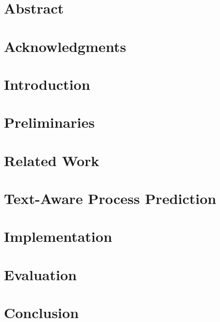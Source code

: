 \documentclass[a4paper,
11pt,
openright,
cleardoublepage=empty,
twoside
]{pads-thesis}
\begin{document}


\gTitlePage

\chapter*{Abstract}%


\chapter*{Acknowledgments} %


\pagestyle{plain}
\tableofcontents

\listoffigures {}

\listoftables {}


\cleardoublepage
\pagestyle{fancy}

\chapter{Introduction} \label{chap:intro}


\chapter{Preliminaries} \label{chap:prelim}


\chapter{Related Work} \label{chap:related_work}


\chapter{Text-Aware Process Prediction} \label{chap:concept}


\chapter{Implementation} \label{chap:impl}


\chapter{Evaluation} \label{chap:eval}


\chapter{Conclusion} \label{chap:conclusion}




\end{document}

